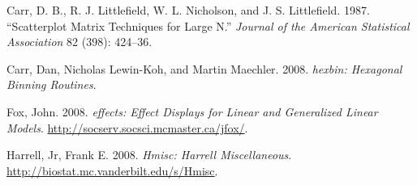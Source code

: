 Carr, D. B., R. J. Littlefield, W. L. Nicholson, and J. S. Littlefield.
1987. ``Scatterplot Matrix Techniques for Large N.'' \emph{Journal of
the American Statistical Association} 82 (398): 424--36.

Carr, Dan, Nicholas Lewin-Koh, and Martin Maechler. 2008. \emph{hexbin:
Hexagonal Binning Routines}.

Fox, John. 2008. \emph{effects: Effect Displays for Linear and
Generalized Linear Models}.
\url{http://socserv.socsci.mcmaster.ca/jfox/}.

Harrell, Jr, Frank E. 2008. \emph{Hmisc: Harrell Miscellaneous}.
\url{http://biostat.mc.vanderbilt.edu/s/Hmisc}.
